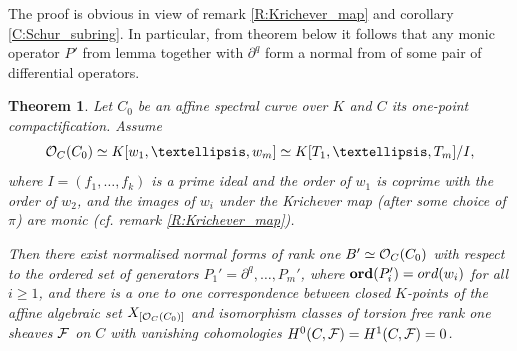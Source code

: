 \documentclass[11pt]{article}
\theoremstyle{definition}
\newcommand{\ord}{\mathop{\rm ord}\nolimits}
\newcommand{\Ord}{\mathop {\rm \bf ord}}
\theoremstyle{plain}
\newtheorem{theorem}{Theorem}[section]
\numberwithin{equation}{section}
\newcommand{\co}{{{\cal O}}}
\newcommand{\cf}{{{\cal F}}}
\begin{document}
The proof is  obvious in view of remark \ref{R:Krichever_map} and corollary \ref{C:Schur_subring}. In particular, from theorem below it follows that any monic operator $P'$ from lemma together with $\partial^q$ form a normal from of some pair of differential operators. 

\begin{theorem}
\label{T:parametrisation}
Let $C_0$ be an affine spectral curve over $K$ and $C$ its one-point compactification. Assume 
$$
\co_C(C_0)\simeq K[w_1,\ldots ,w_m]\simeq K[T_1,\ldots ,T_m]/I,
$$
where $I=(f_1,\ldots ,f_k)$ is a prime ideal and the order of $w_1$ is coprime with the order of $w_2$,  and the images of $w_i$ under the Krichever map (after some choice of $\pi$) are monic (cf. remark \ref{R:Krichever_map}). 

Then there exist normalised normal forms of rank one $B'\simeq \co_C(C_0)$ with respect to the ordered set of generators $P_1'=\partial^q, \ldots , P_m'$, where $\Ord (P_i')=\ord (w_i)$ for all $i\ge 1$, and there is a one to one correspondence between closed $K$-points of the affine algebraic set $X_{[\co_C(C_0)]}$ and isomorphism classes of torsion free rank one sheaves $\cf$ on $C$ with vanishing cohomologies $H^0(C,\cf )= H^1(C,\cf )=0$.
\end{theorem}
\end{document}
